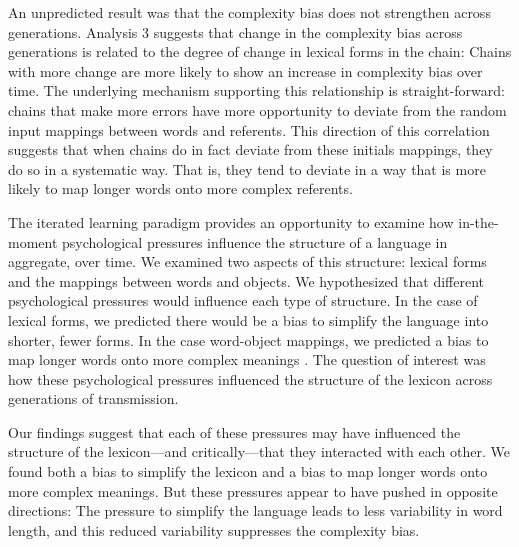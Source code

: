 An unpredicted result was that the complexity bias does not strengthen across generations. Analysis  3 suggests that change in the complexity bias across generations is related to the degree of change in lexical forms in the chain: Chains with more change are more likely to show an increase in complexity bias over time. The underlying mechanism supporting this relationship is straight-forward: chains that make more errors have more opportunity to deviate from the random input mappings between words and referents. This direction of this correlation suggests that when chains do in fact deviate from these initials mappings, they do so in a systematic way. That is, they tend to deviate in a way that is more likely to map longer words onto more complex referents.


The iterated learning paradigm provides an opportunity to examine how in-the-moment psychological pressures influence the structure of a language in aggregate, over time. We examined two aspects of this structure: lexical forms and the mappings between words and objects. We hypothesized that different psychological pressures would influence each type of structure. In the case of lexical forms, we predicted there would be a bias to simplify the language into shorter, fewer forms. In the case word-object mappings, we predicted a bias to map longer words onto more complex meanings \cite{lewisstructure2014}. The question of interest was how these psychological pressures influenced the structure of the lexicon across generations of transmission. 

Our findings suggest that each of these pressures may have influenced the structure of the lexicon---and critically---that they interacted with each other. We found both a bias to simplify the lexicon and a bias to map longer words onto more complex meanings. But these pressures appear to have pushed in opposite directions: The pressure to simplify the language leads to less variability in word length, and this reduced variability suppresses the complexity bias. 


